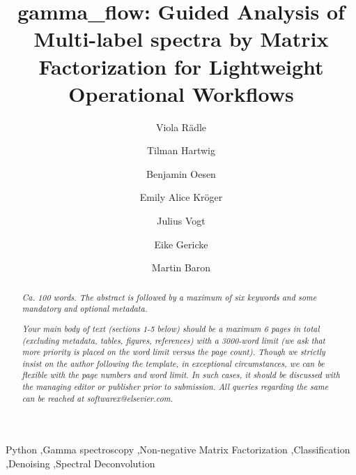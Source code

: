 \documentclass[preprint,12pt, a4paper]{elsarticle}
\begin{document}
\begin{frontmatter}
\title{gamma\_flow: \textbf{G}uided \textbf{A}nalysis of \textbf{M}ulti-label spectra by \textbf{Ma}trix \textbf{F}actorization for \textbf{L}ightweight \textbf{O}perational \textbf{W}orkflows}


\author[ki-lab]{Viola Rädle }
\author[ki-lab]{Tilman Hartwig}
\author[ki-lab]{Benjamin Oesen}
\author[bfs]{Emily Alice Kröger}
\author[bfs]{Julius Vogt}
\author[bfs]{Eike Gericke}
\author[bfs]{Martin Baron}

\address[ki-lab]{Application Lab for AI and Big Data, German Environmental Agency, Leipzig, Germany}
\address[bfs]{Federal Office for Radiation Protection, Berlin, Germany}





\begin{abstract}
\textit{Ca. 100 words. The abstract is followed by a maximum of six keywords
and some mandatory and optional metadata.}

\textit{Your main body of text (sections 1-5 below) should be a maximum 6 pages in total (excluding metadata, tables, figures, references) with a 3000-word limit (we ask that more priority is placed on the word limit versus the page count). Though we strictly insist on the author following the template, in exceptional circumstances, we can be flexible with the page numbers and word limit. In such cases, it should be discussed with the managing editor or publisher prior to submission. All queries regarding the same can be reached at softwarex@elsevier.com.}
\end{abstract}

\begin{keyword}
Python \sep Gamma spectroscopy \sep Non-negative Matrix Factorization \sep Classification \sep Denoising \sep Spectral Deconvolution



\end{keyword}

\end{frontmatter}
\end{document}
